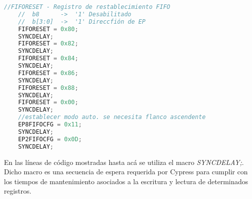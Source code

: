 	\begin{lstlisting}[language=C,backgroundcolor=\color{gray!30}]
	//FIFORESET - Registro de restablecimiento FIFO
	//	b8		->	'1' Desabilitado
	//	b[3:0]	->	'1' Direccfión de EP
	FIFORESET = 0x80;
	SYNCDELAY;
	FIFORESET = 0x82;
	SYNCDELAY;
	FIFORESET = 0x84;
	SYNCDELAY;
	FIFORESET = 0x86;
	SYNCDELAY;
	FIFORESET = 0x88;
	SYNCDELAY;
	FIFORESET = 0x00;
	SYNCDELAY;
	//establecer modo auto. se necesita flanco ascendente
	EP8FIFOCFG = 0x11;
	SYNCDELAY;
	EP2FIFOCFG = 0x0D;
	SYNCDELAY;
	\end{lstlisting}
	

	En las líneas de código mostradas hasta acá se utiliza el macro {\it SYNCDELAY;}. Dicho macro es una secuencia de espera requerida por Cypress para cumplir con los tiempos de mantenimiento asociados a la escritura y lectura de determinados registros\cite{CypressSemiconductor2014fx2lp}.%
